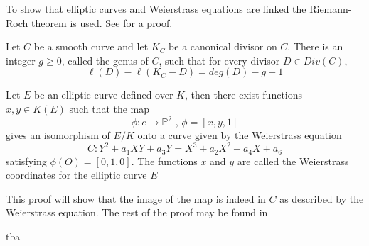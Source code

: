 To show that elliptic curves and Weierstrass equations are linked the Riemann-Roch theorem is used. See \cite{RiemannRoch} for a proof.
\begin{thm}
	Let $C$ be a smooth curve and let $K_C$ be a canonical divisor on $C$. There is an integer $g\geq0$, called the genus of $C$, such that for every divisor $D\in Div(C)$,
	\begin{equation*}
	\ell(D)-\ell(K_C-D)=deg(D)-g+1
	\end{equation*}
\end{thm}

\begin{thm}
	Let $E$ be an elliptic curve defined over $K$, then there exist functions $x,y\in K(E)$ such that the map
	\begin{equation*}
		\phi:e\to\mathbb{P}^2\text{ , }\phi=[x,y,1]
	\end{equation*}
	gives an isomorphism of $E/K$ onto a curve given by the Weierstrass equation
	\begin{equation*}
	C:Y^2+a_1XY+a_3Y=X^3+a_2X^2+a_4X+a_6
	\end{equation*}
	satisfying $\phi(O)=[0,1,0]$. The functions $x$ and $y$ are called the Weierstrass coordinates for the elliptic curve $E$
\end{thm}

This proof will show that the image of the map is indeed in $C$ as described by the Weierstrass equation. The rest of the proof may be found in \cite[page 60]{EllipticCurvesBook}
\begin{prf}
	tba
\end{prf}

